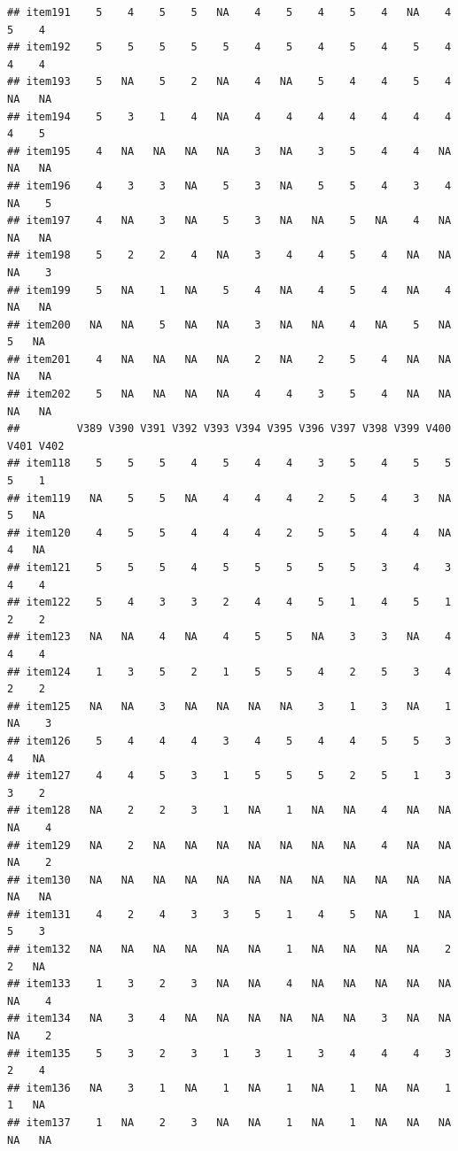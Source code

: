 \documentclass[
  man]{apa6}
\begin{document}
\begin{verbatim}
## item191    5    4    5    5   NA    4    5    4    5    4   NA    4    5    4
## item192    5    5    5    5    5    4    5    4    5    4    5    4    4    4
## item193    5   NA    5    2   NA    4   NA    5    4    4    5    4   NA   NA
## item194    5    3    1    4   NA    4    4    4    4    4    4    4    4    5
## item195    4   NA   NA   NA   NA    3   NA    3    5    4    4   NA   NA   NA
## item196    4    3    3   NA    5    3   NA    5    5    4    3    4   NA    5
## item197    4   NA    3   NA    5    3   NA   NA    5   NA    4   NA   NA   NA
## item198    5    2    2    4   NA    3    4    4    5    4   NA   NA   NA    3
## item199    5   NA    1   NA    5    4   NA    4    5    4   NA    4   NA   NA
## item200   NA   NA    5   NA   NA    3   NA   NA    4   NA    5   NA    5   NA
## item201    4   NA   NA   NA   NA    2   NA    2    5    4   NA   NA   NA   NA
## item202    5   NA   NA   NA   NA    4    4    3    5    4   NA   NA   NA   NA
##         V389 V390 V391 V392 V393 V394 V395 V396 V397 V398 V399 V400 V401 V402
## item118    5    5    5    4    5    4    4    3    5    4    5    5    5    1
## item119   NA    5    5   NA    4    4    4    2    5    4    3   NA    5   NA
## item120    4    5    5    4    4    4    2    5    5    4    4   NA    4   NA
## item121    5    5    5    4    5    5    5    5    5    3    4    3    4    4
## item122    5    4    3    3    2    4    4    5    1    4    5    1    2    2
## item123   NA   NA    4   NA    4    5    5   NA    3    3   NA    4    4    4
## item124    1    3    5    2    1    5    5    4    2    5    3    4    2    2
## item125   NA   NA    3   NA   NA   NA   NA    3    1    3   NA    1   NA    3
## item126    5    4    4    4    3    4    5    4    4    5    5    3    4   NA
## item127    4    4    5    3    1    5    5    5    2    5    1    3    3    2
## item128   NA    2    2    3    1   NA    1   NA   NA    4   NA   NA   NA    4
## item129   NA    2   NA   NA   NA   NA   NA   NA   NA    4   NA   NA   NA    2
## item130   NA   NA   NA   NA   NA   NA   NA   NA   NA   NA   NA   NA   NA   NA
## item131    4    2    4    3    3    5    1    4    5   NA    1   NA    5    3
## item132   NA   NA   NA   NA   NA   NA    1   NA   NA   NA   NA    2    2   NA
## item133    1    3    2    3   NA   NA    4   NA   NA   NA   NA   NA   NA    4
## item134   NA    3    4   NA   NA   NA   NA   NA   NA    3   NA   NA   NA    2
## item135    5    3    2    3    1    3    1    3    4    4    4    3    2    4
## item136   NA    3    1   NA    1   NA    1   NA    1   NA   NA    1    1   NA
## item137    1   NA    2    3   NA   NA    1   NA    1   NA   NA   NA   NA   NA

\end{verbatim}
\end{document}
